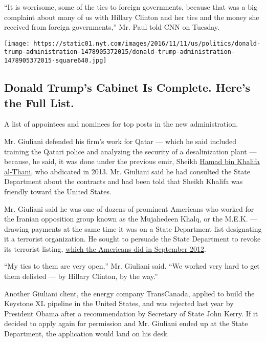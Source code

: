 ``It is worrisome, some of the ties to foreign governments, because that
was a big complaint about many of us with Hillary Clinton and her ties
and the money she received from foreign governments,'' Mr. Paul told CNN
on Tuesday.

\href{https://www.nytimes.com/interactive/2016/us/politics/donald-trump-administration.html}{}

\texttt{[image: https://static01.nyt.com/images/2016/11/11/us/politics/donald-trump-administration-1478905372015/donald-trump-administration-1478905372015-square640.jpg]}

\hypertarget{donald-trumps-cabinet-is-complete-heres-the-full-list}{%
\subsection{Donald Trump's Cabinet Is Complete. Here's the Full
List.}\label{donald-trumps-cabinet-is-complete-heres-the-full-list}}

A list of appointees and nominees for top posts in the new
administration.

Mr. Giuliani defended his firm's work for Qatar --- which he said
included training the Qatari police and analyzing the security of a
desalinization plant --- because, he said, it was done under the
previous emir, Sheikh
\href{https://en.wikipedia.org/wiki/Hamad_bin_Khalifa_Al_Thanihttps://www.nytimes.com/2016/10/25/world/middleeast/sheikh-khalifa-bin-hamad-al-thani-former-emir-of-qatar-dies-at-84.html}{Hamad
bin Khalifa al-Thani}, who abdicated in 2013. Mr. Giuliani said he had
consulted the State Department about the contracts and had been told
that Sheikh Khalifa was friendly toward the United States.

Mr. Giuliani said he was one of dozens of prominent Americans who worked
for the Iranian opposition group known as the Mujahedeen Khalq, or the
M.E.K. --- drawing payments at the same time it was on a State
Department list designating it a terrorist organization. He sought to
persuade the State Department to revoke its terrorist listing,
\href{http://www.state.gov/r/pa/prs/ps/2012/09/198443.htm}{which the
Americans did in September 2012}.

``My ties to them are very open,'' Mr. Giuliani said. ``We worked very
hard to get them delisted --- by Hillary Clinton, by the way.''

Another Giuliani client, the energy company TransCanada, applied to
build the Keystone XL pipeline in the United States, and was rejected
last year by President Obama after a recommendation by Secretary of
State John Kerry. If it decided to apply again for permission and Mr.
Giuliani ended up at the State Department, the application would land on
his desk.


